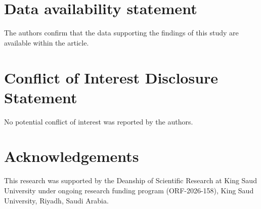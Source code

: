 \documentclass[final,3p,times,fleqn]{elsarticle}
\begin{document}
\section*{Data availability statement}
The authors confirm that the data supporting the findings of this study are available within the article.

\section*{Conflict of Interest Disclosure Statement}
No potential conflict of interest was reported by the authors.

\section*{Acknowledgements}
This research was supported by the Deanship of Scientific Research at King Saud University under ongoing research
funding program (ORF-2026-158), King Saud University, Riyadh, Saudi Arabia.

\appendix
\renewcommand{\thetable}{\Alph{section}.\arabic{table}}
\renewcommand{\thefigure}{\Alph{section}.\arabic{figure}}
\renewcommand{\theHtable}{app.\Alph{section}.\arabic{table}}
\renewcommand{\theHfigure}{app.\Alph{section}.\arabic{figure}}






\end{document}
